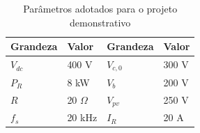 \begin{table}[H]
    \caption{Parâmetros adotados para o projeto demonstrativo}
    \label{tab:parametros}
    \centering
    \begin{tabular}{llll}
        \toprule
        Grandeza & Valor & Grandeza & Valor \\
        \midrule
        $V_{dc}$                & 400 V          & $V_{c,0}$            & 300 V          \\
        $P_R$                   & 8 kW           &  $V_b$                & 200 V        \\
        $R$                     & 20 $\Omega$    & $V_{pv}$                & 250 V       \\
        $f_s$                   & 20 kHz         & $I_R$                & 20 A           \\
       
        \bottomrule
    \end{tabular}
\end{table}





